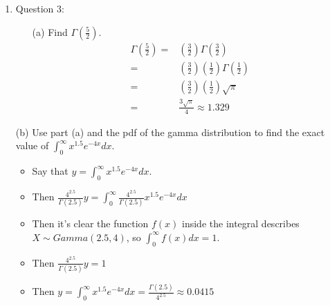 \documentclass{article}
\begin{document}
\begin{enumerate}
\item Question 3:
    \begin{itemize}
    \item [(a)] Find $\Gamma\left(\frac{5}{2}\right)$.
        \begin{equation*}
        \begin{aligned}
        \Gamma\left(\frac{5}{2}\right) = & \left(\frac{3}{2}\right) \Gamma\left(\frac{3}{2}\right) \\
            = & \left(\frac{3}{2}\right) \left(\frac{1}{2}\right) \Gamma\left(\frac{1}{2}\right) \\
            = & \left(\frac{3}{2}\right) \left(\frac{1}{2}\right) \sqrt{\pi} \\
            = & \frac{3\sqrt{\pi}}{4} \approx 1.329
        \end{aligned}
        \end{equation*}
    \end{itemize}
    \item [(b)] Use part (a) and the pdf of the gamma distribution  to find the exact value of $\int_{0}^{\infty}x^{1.5}e^{-4x}dx$.
        \begin{itemize}
        \item Say that $y = \int_{0}^{\infty}x^{1.5}e^{-4x}dx$.
        \item Then $\frac{4^{2.5}}{\Gamma(2.5)} y = \int_{0}^{\infty} \frac{4^{2.5}}{\Gamma(2.5)} x^{1.5}e^{-4x} dx$
        \item Then it's clear the function $f(x)$ inside the integral describes $X \sim Gamma(2.5, 4)$, so $\int_{0}^{\infty} f(x) dx = 1$.
        \item Then $\frac{4^{2.5}}{\Gamma(2.5)} y = 1$
        \item Then $y = \int_{0}^{\infty}x^{1.5}e^{-4x}dx = \frac{\Gamma(2.5)}{4^{2.5}} \approx 0.0415$
        \end{itemize}


\end{enumerate}
\end{document}
